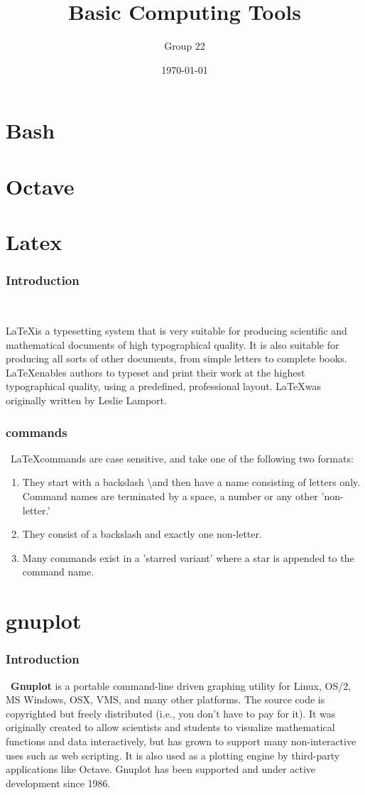 \documentclass{beamer}
\author{ Group 22 }
\title{Basic Computing Tools}
\date{\today}
\begin{document}
\frame{\titlepage}
\section{Bash}
\section{Octave}
\section{Latex}

\begin{frame}
\frametitle{Introduction}\

\LaTeX is a typesetting system that is very suitable for producing scientific and mathematical documents of high typographical quality. It is also suitable for producing all sorts of other documents, from simple letters to complete books.\\
\LaTeX enables authors to typeset and print their work at the highest typographical quality, using a predefined, professional layout. \LaTeX was originally written by Leslie Lamport.
	
\end{frame}

\begin{frame}
\frametitle{commands}\
\LaTeX commands are case sensitive, and take one of the following two formats:
	\begin{enumerate}
		\item They start with a backslash \textbackslash and then have a name consisting of
		letters only. Command names are terminated by a space, a number or
		any other 'non-letter.'
		\item They consist of a backslash and exactly one non-letter.
		\item Many commands exist in a 'starred variant' where a star is appended
		to the command name.
	\end{enumerate}
\end{frame}


\section{gnuplot}
\begin{frame}
\frametitle{Introduction}\
\textbf{Gnuplot} is a portable command-line driven graphing utility for Linux, OS/2, MS Windows, OSX, VMS, and many other platforms. The source code is copyrighted but freely distributed (i.e., you don't have to pay for it). It was originally created to allow scientists and students to visualize mathematical functions and data interactively, but has grown to support many non-interactive uses such as web scripting. It is also used as a plotting engine by third-party applications like Octave. Gnuplot has been supported and under active development since 1986. \\
\end{frame}
\end{document}
